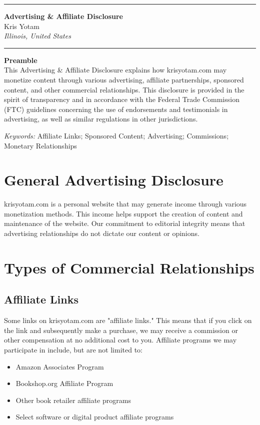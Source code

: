 \documentclass[11pt]{article}
\newcommand{\TitleLine}{\noindent\rule{\textwidth}{0.4pt}}
\begin{document}
\onehalfspacing

\vspace*{-1em}
\TitleLine
\vspace{0.5em}
\begin{center}
  {\Large\bfseries Advertising \& Affiliate Disclosure}\\[0.75em]
  {\normalsize Kris Yotam}\\
  {\itshape Illinois, United States}
\end{center}
\vspace{0.5em}
\TitleLine

\vspace{1.5em}

\noindent\textbf{Preamble}\\
This Advertising \& Affiliate Disclosure explains how krisyotam.com may monetize content through various advertising, affiliate partnerships, sponsored content, and other commercial relationships. This disclosure is provided in the spirit of transparency and in accordance with the Federal Trade Commission (FTC) guidelines concerning the use of endorsements and testimonials in advertising, as well as similar regulations in other jurisdictions.

\vspace{0.75em}
\noindent\textit{Keywords:} Affiliate Links; Sponsored Content; Advertising; Commissions; Monetary Relationships

\vspace{1.5em}

\section{General Advertising Disclosure}
krisyotam.com is a personal website that may generate income through various monetization methods. This income helps support the creation of content and maintenance of the website. Our commitment to editorial integrity means that advertising relationships do not dictate our content or opinions.

\section{Types of Commercial Relationships}

\subsection{Affiliate Links}
Some links on krisyotam.com are "affiliate links." This means that if you click on the link and subsequently make a purchase, we may receive a commission or other compensation at no additional cost to you. Affiliate programs we may participate in include, but are not limited to:
\begin{itemize}
  \item Amazon Associates Program
  \item Bookshop.org Affiliate Program
  \item Other book retailer affiliate programs
  \item Select software or digital product affiliate programs
\end{itemize}
\end{document}

